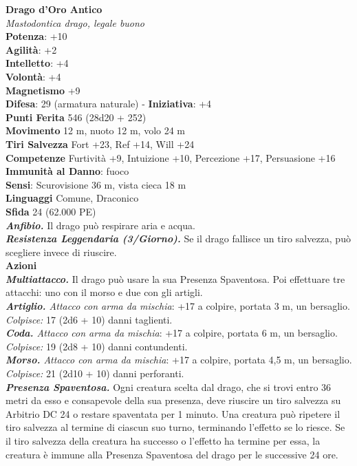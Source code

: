\begin{multicols}{2}
\medskip\textbf{Drago d'Oro Antico}\\
\emph{Mastodontica drago, legale buono}\\
\textbf{Potenza}: +10\\
\textbf{Agilità}: +2\\
\textbf{Intelletto}: +4\\
\textbf{Volontà}: +4\\
\textbf{Magnetismo} +9\\
\textbf{Difesa}: 29 (armatura naturale) - \textbf{Iniziativa}: +4\\
\textbf{Punti Ferita} 546 (28d20 + 252) \\
\textbf{Movimento} 12 m, nuoto 12 m, volo 24 m\\
\textbf{Tiri Salvezza} Fort +23, Ref +14, Will +24\\
\textbf{Competenze} Furtività +9, Intuizione +10, Percezione +17, Persuasione +16\\
\textbf{Immunità al Danno}: fuoco\\
\textbf{Sensi}: Scurovisione 36 m, vista cieca 18 m\\
\textbf{Linguaggi} Comune, Draconico\\
\textbf{Sfida} 24 (62.000 PE)\smallskip\\
\emph{\textbf{Anfibio.}} Il drago può respirare aria e acqua.\\
\emph{\textbf{Resistenza Leggendaria (3/Giorno).}} Se il drago fallisce un tiro salvezza, può scegliere invece di riuscire.\\
\smallskip\textbf{Azioni}\\
\emph{\textbf{Multiattacco.}} Il drago può usare la sua Presenza Spaventosa. Poi effettuare tre attacchi: uno con il morso e due con gli artigli.\\
\emph{\textbf{Artiglio.} Attacco con arma da mischia}: +17 a colpire, portata 3 m, un bersaglio.\\
\emph{Colpisce:} 17 (2d6 + 10) danni taglienti.\\
\emph{\textbf{Coda.} Attacco con arma da mischia}: +17 a colpire, portata 6 m, un bersaglio.\\
\emph{Colpisce:} 19 (2d8 + 10) danni contundenti.\\
\emph{\textbf{Morso.} Attacco con arma da mischia}: +17 a colpire, portata 4,5 m, un bersaglio.\\
\emph{Colpisce:} 21 (2d10 + 10) danni perforanti.\\
\emph{\textbf{Presenza Spaventosa.}} Ogni creatura scelta dal drago, che si trovi entro 36 metri da esso e consapevole della sua presenza, deve riuscire un tiro salvezza su Arbitrio DC 24 o restare spaventata per 1 minuto. Una creatura può ripetere il tiro salvezza al termine di ciascun suo turno, terminando l'effetto se lo riesce. Se il tiro salvezza della creatura ha successo o l'effetto ha termine per essa, la creatura è immune alla Presenza Spaventosa del drago per le successive 24 ore. \\

\end{multicols}
